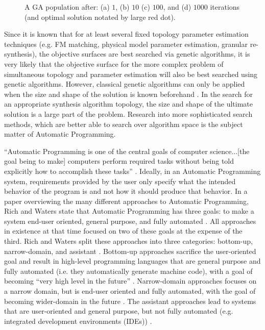 \documentclass[a4paper,12pt]{report} 	%
\numberwithin{figure}{chapter}
\numberwithin{table}{chapter}
\numberwithin{equation}{chapter}
\begin{document}
\begin{flushleft}
\begin{figure}[h!]
\begin{center}
\caption[GA Example]{A GA population after: (a) $1$, (b) $10$ (c) $100$, and (d) $1000$ iterations (and optimal solution notated by large red dot).}
\end{center}
\end{figure}
Since it is known that for at least several fixed topology parameter estimation techniques (e.g. FM matching, physical model parameter estimation, granular re-synthesis), the objective surfaces are best searched via genetic algorithms, it is very likely that the objective surface for the more complex problem of simultaneous topology and parameter estimation will also be best searched using genetic algorithms. However, classical genetic algorithms can only be applied when the size and shape of the solution is known beforehand \cite[p. 42]{Vanneschi:2004le}. In the search for an appropriate synthesis algorithm topology, the size and shape of the ultimate solution is a large part of the problem. Research into more sophisticated search methods, which are better able to search over algorithm space is the subject matter of Automatic Programming.

``Automatic Programming is one of the central goals of computer science...[the goal being to make] computers perform required tasks without being told explicitly how to accomplish these tasks'' \cite[p.3]{Koza:1997zr}. Ideally, in an Automatic Programming system, requirements provided by the user only specify what the intended behavior of the program is and not how it should produce that behavior. In a paper overviewing the many different approaches to Automatic Programming, Rich and Waters \cite{Rich:1992sp} state that Automatic Programming has three goals: to make a system end-user oriented, general purpose, and fully automated \cite[p. 4]{Rich:1992sp}. All approaches in existence at that time focused on two of these goals at the expense of the third. Rich and Waters split these approaches into three categories: bottom-up, narrow-domain, and assistant \cite[p. 3]{Rich:1992sp}. Bottom-up approaches sacrifice the user-oriented goal and result in high-level programming languages that are general purpose and fully automated (i.e. they automatically generate machine code), with a goal of becoming ``very high level in the future'' \cite[p. 3]{Rich:1992sp}. Narrow-domain approaches focuses on a narrow domain, but is end-user oriented and fully automated, with the goal of becoming wider-domain in the future \cite[p. 4]{Rich:1992sp}. The assistant approaches lead to systems that are user-oriented and general purpose, but not fully automated (e.g. integrated development environments (IDEs)) \cite[p. 4]{Rich:1992sp}. 


\end{flushleft}
\end{document}
